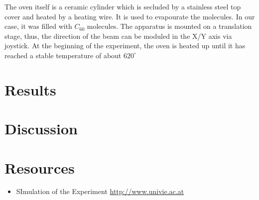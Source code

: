 \documentclass[12pt,a4paper]{article}
\begin{document}
\begin{multicols}{2}
The oven itself is a ceramic cylinder which is secluded by a stainless steel top cover and heated by a heating wire. It is used to evapourate the molecules. In our case, it was filled with $C_{60}$ molecules. The apparatus is mounted on a translation stage, thus, the direction of the beam can be moduled in the X/Y axis via joystick.
At the beginning of the experiment, the oven is heated up until it has reached a stable temperature of about $620^\circ$

\section{Results}





\section{Discussion}


\section{Resources}
\begin{itemize}
	\item SImulation of the Experiment \url{http://www.univie.ac.at}
\end{itemize}
%
%

\end{multicols}
\end{document}
